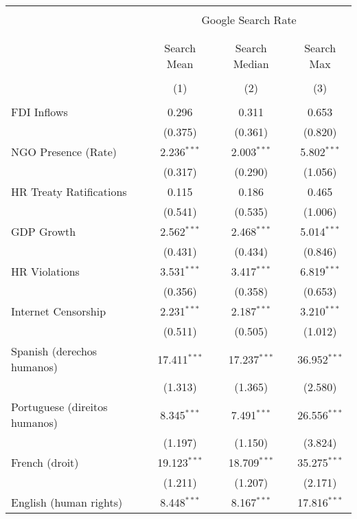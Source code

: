 
\begin{table}[!htbp] \centering 
  \caption{} 
  \label{} 
\begin{tabular}{@{\extracolsep{5pt}}lccc} 
\\[-1.8ex]\hline 
\hline \\[-1.8ex] 
 & \multicolumn{3}{c}{Google Search Rate} \\ 
\cline{2-4} 
\\[-1.8ex] & \multicolumn{3}{c}{ } \\ 
 & Search Mean & Search Median & Search Max \\ 
\\[-1.8ex] & (1) & (2) & (3)\\ 
\hline \\[-1.8ex] 
 FDI Inflows & 0.296 & 0.311 & 0.653 \\ 
  & (0.375) & (0.361) & (0.820) \\ 
  NGO Presence (Rate) & 2.236$^{***}$ & 2.003$^{***}$ & 5.802$^{***}$ \\ 
  & (0.317) & (0.290) & (1.056) \\ 
  HR Treaty Ratifications & 0.115 & 0.186 & 0.465 \\ 
  & (0.541) & (0.535) & (1.006) \\ 
  GDP Growth & 2.562$^{***}$ & 2.468$^{***}$ & 5.014$^{***}$ \\ 
  & (0.431) & (0.434) & (0.846) \\ 
  HR Violations & 3.531$^{***}$ & 3.417$^{***}$ & 6.819$^{***}$ \\ 
  & (0.356) & (0.358) & (0.653) \\ 
  Internet Censorship & 2.231$^{***}$ & 2.187$^{***}$ & 3.210$^{***}$ \\ 
  & (0.511) & (0.505) & (1.012) \\ 
  Spanish (derechos humanos) & 17.411$^{***}$ & 17.237$^{***}$ & 36.952$^{***}$ \\ 
  & (1.313) & (1.365) & (2.580) \\ 
  Portuguese (direitos humanos) & 8.345$^{***}$ & 7.491$^{***}$ & 26.556$^{***}$ \\ 
  & (1.197) & (1.150) & (3.824) \\ 
  French (droit) & 19.123$^{***}$ & 18.709$^{***}$ & 35.275$^{***}$ \\ 
  & (1.211) & (1.207) & (2.171) \\ 
  English (human rights) & 8.448$^{***}$ & 8.167$^{***}$ & 17.816$^{***}$ \\ 

\end{tabular}
\end{table}

